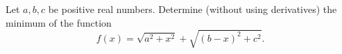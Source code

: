 Let $a,b,c$ be positive real numbers.
Determine (without using derivatives) the minimum of the function
$$f(x)=\sqrt{a^2+x^2}+\sqrt{(b-x)^2+c^2}.$$